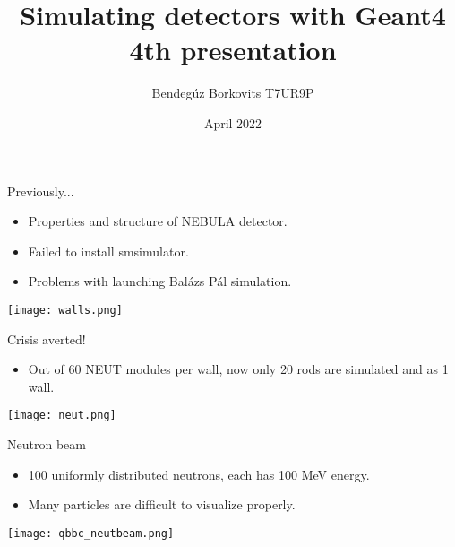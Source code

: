 \documentclass[11pt]{beamer}
\author{Bendegúz Borkovits T7UR9P}
\title{Simulating detectors with Geant4 4th presentation}
\institute{Scientific Modeling Computer Laboratory}
\date{April 2022}
\begin{document}
\begin{frame}
\titlepage
\end{frame}

\begin{frame}{Previously...}
    \begin{itemize}
        \item<tri@1-> Properties and structure of NEBULA detector.
        \vspace{0.2 cm}
        \item<tri@1-> Failed to install smsimulator.
        \vspace{0.2 cm}
        \item<tri@1-> Problems with launching Balázs Pál simulation.
        \vspace{0.2 cm}
    \end{itemize}
    \centering
    \texttt{[image: walls.png]}
\end{frame}

\begin{frame}{Crisis averted!}
    \begin{itemize}
        \item<tri@1-> Out of 60 NEUT modules per wall, now only 20 rods are simulated and as 1 wall.
        \vspace{0.2 cm}
    \end{itemize}
    \centering
    \texttt{[image: neut.png]}
\end{frame}

\begin{frame}{Neutron beam}
        \begin{itemize}
        \item<tri@1-> 100 uniformly distributed neutrons, each has 100 MeV energy.
        \vspace{0.2 cm}
        \item<tri@1-> Many particles are difficult to visualize properly.
        \vspace{0.2 cm}
    \end{itemize}
    \centering
    \texttt{[image: qbbc\_neutbeam.png]}
\end{frame}
\end{document}
